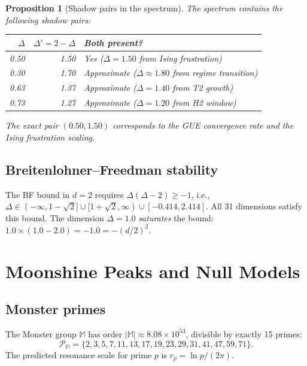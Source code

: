 \documentclass[11pt]{amsart}
\newtheorem{proposition}[theorem]{Proposition}
\theoremstyle{definition}
\begin{document}
\begin{proposition}[Shadow pairs in the spectrum]
The spectrum contains the following shadow pairs:
\begin{center}
\begin{tabular}{r r l}
\toprule
$\Delta$ & $\Delta' = 2 - \Delta$ & Both present? \\
\midrule
0.50 & 1.50 & Yes ($\Delta = 1.50$ from Ising frustration) \\
0.30 & 1.70 & Approximate ($\Delta \approx 1.80$ from regime transition) \\
0.63 & 1.37 & Approximate ($\Delta = 1.40$ from T2 growth) \\
0.73 & 1.27 & Approximate ($\Delta = 1.20$ from H2 window) \\
\bottomrule
\end{tabular}
\end{center}
The exact pair $(0.50, 1.50)$ corresponds to the GUE convergence rate and the Ising frustration scaling.
\end{proposition}

\subsection{Breitenlohner--Freedman stability}

The BF bound in $d = 2$ requires $\Delta(\Delta - 2) \geq -1$, i.e., $\Delta \in (-\infty, 1 - \sqrt{2}] \cup [1 + \sqrt{2}, \infty) \cup [-0.414, 2.414]$. All 31 dimensions satisfy this bound. The dimension $\Delta = 1.0$ \emph{saturates} the bound: $1.0 \times (1.0 - 2.0) = -1.0 = -(d/2)^2$.


\section{Moonshine Peaks and Null Models}
\label{sec:moonshine}

\subsection{Monster primes}

The Monster group $\mathbb{M}$ has order $|\mathbb{M}| \approx 8.08 \times 10^{53}$, divisible by exactly 15 primes:
\[
\mathcal{P}_{\mathbb{M}} = \{2, 3, 5, 7, 11, 13, 17, 19, 23, 29, 31, 41, 47, 59, 71\}.
\]
The predicted resonance scale for prime $p$ is $r_p = \ln p / (2\pi)$.
\end{document}
